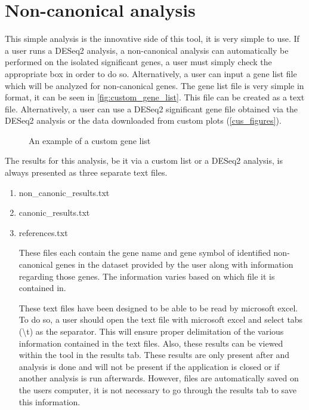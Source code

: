 \documentclass[11pt]{article}
\begin{document}
\section{Non-canonical analysis \label{ncan_analysis}}
This simple analysis is the innovative side of this tool, it is very simple to use. If a user runs a DESeq2 analysis, a non-canonical analysis can automatically be performed on the isolated significant genes, a user must simply check the appropriate box in order to do so. Alternatively, a user can input a gene list file which will be analyzed for non-canonical genes.
The gene list file is very simple in format, it can be seen in \autoref{fig:custom_gene_list}. This file can be created as a text file.
Alternatively, a user can use a DESeq2 significant gene file obtained via the DESeq2 analysis or the data downloaded from custom plots (\autoref{cus_figures}).

\begin{figure}[h!]
\centering
{}
\caption{An example of a custom gene list}
\label{fig:custom_gene_list}
\end{figure}

The results for this analysis, be it via a custom list or a DESeq2 analysis, is always presented as three separate text files.
\begin{enumerate}
\item non\_canonic\_results.txt
\item canonic\_results.txt
\item references.txt

These files each contain the gene name and gene symbol of identified non-canonical genes in the dataset provided by the user along with information regarding those genes. The information varies based on which file it is contained in.

These text files have been designed to be able to be read by microsoft excel. To do so, a user should open the text file with microsoft excel and select tabs (\textbackslash t) as the separator. This will ensure proper delimitation of the various information contained in the text files.
Also, these results can be viewed within the tool in the results tab. These results are only present after and analysis is done and will not be present if the application is closed or if another analysis is run afterwards. However, files are automatically saved on the users computer, it is not necessary to go through the results tab to save this information.
\end{enumerate}
\end{document}

